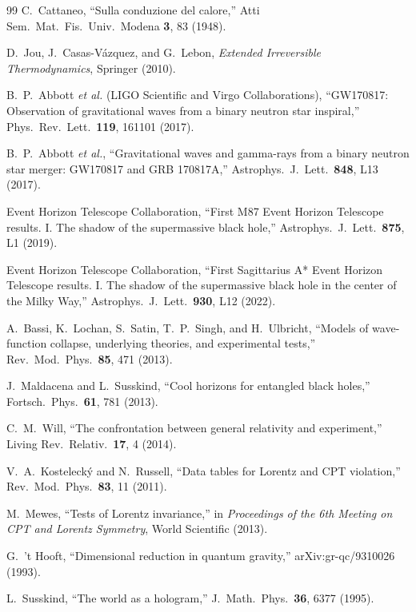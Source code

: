 \documentclass[aps,prd,twocolumn,showpacs,superscriptaddress,preprintnumbers]{revtex4-2}
\begin{document}
\begin{thebibliography}{99}
C.~Cattaneo,
``Sulla conduzione del calore,''
Atti Sem.\ Mat.\ Fis.\ Univ.\ Modena \textbf{3}, 83 (1948).

D.~Jou, J.~Casas-V{\'a}zquez, and G.~Lebon,
\textit{Extended Irreversible Thermodynamics},
Springer (2010).

B.~P.~Abbott \textit{et al.} (LIGO Scientific and Virgo Collaborations),
``GW170817: Observation of gravitational waves from a binary neutron star inspiral,''
Phys.\ Rev.\ Lett.\ \textbf{119}, 161101 (2017).

B.~P.~Abbott \textit{et al.},
``Gravitational waves and gamma-rays from a binary neutron star merger: GW170817 and GRB 170817A,''
Astrophys.\ J.\ Lett.\ \textbf{848}, L13 (2017).

Event Horizon Telescope Collaboration,
``First M87 Event Horizon Telescope results. I. The shadow of the supermassive black hole,''
Astrophys.\ J.\ Lett.\ \textbf{875}, L1 (2019).

Event Horizon Telescope Collaboration,
``First Sagittarius A* Event Horizon Telescope results. I. The shadow of the supermassive black hole in the center of the Milky Way,''
Astrophys.\ J.\ Lett.\ \textbf{930}, L12 (2022).

A.~Bassi, K.~Lochan, S.~Satin, T.~P.~Singh, and H.~Ulbricht,
``Models of wave-function collapse, underlying theories, and experimental tests,''
Rev.\ Mod.\ Phys.\ \textbf{85}, 471 (2013).

J.~Maldacena and L.~Susskind,
``Cool horizons for entangled black holes,''
Fortsch.\ Phys.\ \textbf{61}, 781 (2013).

C.~M.~Will,
``The confrontation between general relativity and experiment,''
Living Rev.\ Relativ.\ \textbf{17}, 4 (2014).

V.~A.~Kosteleck{\'y} and N.~Russell,
``Data tables for Lorentz and CPT violation,''
Rev.\ Mod.\ Phys.\ \textbf{83}, 11 (2011).

M.~Mewes,
``Tests of Lorentz invariance,''
in \textit{Proceedings of the 6th Meeting on CPT and Lorentz Symmetry},
World Scientific (2013).

G.~'t Hooft,
``Dimensional reduction in quantum gravity,''
arXiv:gr-qc/9310026 (1993).

L.~Susskind,
``The world as a hologram,''
J.\ Math.\ Phys.\ \textbf{36}, 6377 (1995).

\end{thebibliography}
\end{document}
